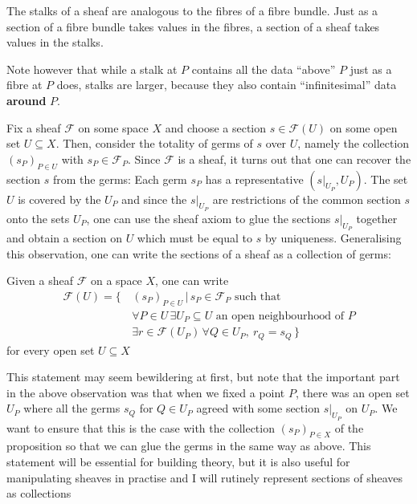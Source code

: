 The stalks of a sheaf are analogous to the fibres of a fibre bundle.
Just as a section of a fibre bundle takes values in the fibres, a section of
a sheaf takes values in the stalks.
\begin{lwarn}
  Note however that while a stalk at $P$ contains all the data ``above'' $P$
  just as a fibre at $P$ does, stalks are larger, because they also contain
  ``infinitesimal'' data \textbf{around} $P$.
\end{lwarn}
Fix a sheaf $\mathscr{F}$ on some space $X$ and choose a section
$s\in \mathscr{F}(U)$ on some open set $U\subseteq X$. Then, consider
the totality of germs of $s$ over $U$, namely the collection
$(s_{P})_{P\in U}$ with $s_{P}\in\mathscr{F}_{P}$. Since $\mathscr{F}$ is a
sheaf, it turns out that one can recover the section $s$ from the
germs: Each germ $s_{P}$ has a representative $(s\vert_{U_{P}}, U_{P})$.
The set $U$ is covered by the $U_{P}$ and since the $s\vert_{U_{P}}$ are
restrictions of the common section $s$ onto the sets $U_{P}$, one can use the
sheaf axiom to glue the sections $s\vert_{U_{P}}$ together and obtain a
section on $U$ which must be equal to $s$ by uniqueness. Generalising this
observation, one can write the sections of a sheaf as a collection of germs:
\begin{lemm}\label{lemm:sheafify_sheaf}
  Given a sheaf $\mathscr{F}$ on a space $X$, one can write
  \begin{align*}
    \mathscr{F}(U)=\big\{\,
    & (s_{P})_{P\in U}\,\big\vert\, s_{P}\in\mathscr{F}_{P}\text{ such that} \\
    & \forall P\in U\,
      \exists U_{P}\subseteq U\text{ an open neighbourhood of }P \\
    & \exists r\in\mathscr{F}(U_{P})\,\forall Q\in U_{P},\ r_{Q}=s_{Q}\,\big\}
  \end{align*}
  for every open set $U\subseteq X$
\end{lemm}
This statement may seem bewildering at first, but note that the important
part in the above observation was that when we fixed a point $P$, there was
an open set $U_{P}$ where all the germs $s_{Q}$ for $Q\in U_{P}$ agreed
with some section $s\vert_{U_{P}}$ on $U_{P}$. We want to ensure that this is
the case with the collection $(s_{P})_{P\in X}$ of the proposition so that we
can glue the germs in the same way as above. This statement will be essential
for building theory, but it is also useful for manipulating sheaves in
practise and I will rutinely represent sections of sheaves as collections
